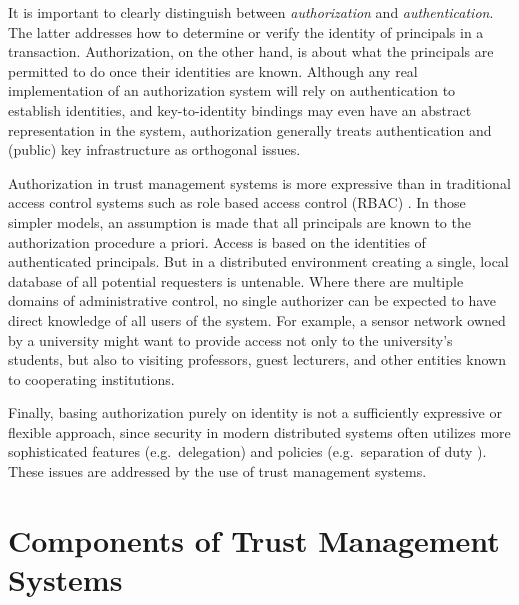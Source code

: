 It is important to clearly distinguish between \emph{authorization} and \emph{authentication}.
The latter addresses how to determine or verify the identity of principals in a transaction.
Authorization, on the other hand, is about what the principals are permitted to do once their
identities are known. Although any real implementation of an authorization system will rely on
authentication to establish identities, and key-to-identity bindings may even have an abstract
representation in the system, authorization generally treats authentication and (public) key
infrastructure as orthogonal issues.

Authorization in trust management systems is more expressive than in traditional access control
systems such as role based access control (RBAC) \cite{Sandhu:RBACM}. In those simpler models,
an assumption is made that all principals are known to the authorization procedure a priori.
Access is based on the identities of authenticated principals. But in a distributed environment
creating a single, local database of all potential requesters is untenable. Where there are
multiple domains of administrative control, no single authorizer can be expected to have direct
knowledge of all users of the system. For example, a sensor network owned by a university might
want to provide access not only to the university's students, but also to visiting professors,
guest lecturers, and other entities known to cooperating institutions.

Finally, basing authorization purely on identity is not a sufficiently expressive or flexible
approach, since security in modern distributed systems often utilizes more sophisticated
features (e.g.~delegation) and policies (e.g.~separation of duty \cite{Simon:SODRBE}). These
issues are addressed by the use of trust management systems.

\section{Components of Trust Management Systems}
\label{section-components}

